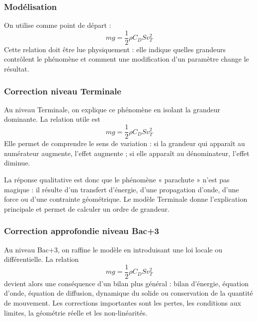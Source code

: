 \documentclass[11pt,a4paper]{article}
\begin{document}
\subsubsection*{Modélisation}

\begin{theorembox}
On utilise comme point de départ :
\[
mg=\frac12\rho C_DSv_T^2
\]
Cette relation doit être lue physiquement : elle indique quelles grandeurs contrôlent le phénomène et comment une modification d'un paramètre change le résultat.
\end{theorembox}

\subsubsection*{Correction niveau Terminale}

\begin{corrigebox}

Au niveau Terminale, on explique ce phénomène en isolant la grandeur dominante. La relation utile est
\[
mg=\frac12\rho C_DSv_T^2
\]
Elle permet de comprendre le sens de variation : si la grandeur qui apparaît au numérateur augmente, l'effet augmente ; si elle apparaît au dénominateur, l'effet diminue.

La réponse qualitative est donc que le phénomène « parachute » n'est pas magique : il résulte d'un transfert d'énergie, d'une propagation d'onde, d'une force ou d'une contrainte géométrique. Le modèle Terminale donne l'explication principale et permet de calculer un ordre de grandeur.

\end{corrigebox}

\subsubsection*{Correction approfondie niveau Bac+3}

\begin{approfondissementbox}

Au niveau Bac+3, on raffine le modèle en introduisant une loi locale ou différentielle. La relation
\[
mg=\frac12\rho C_DSv_T^2
\]
devient alors une conséquence d'un bilan plus général : bilan d'énergie, équation d'onde, équation de diffusion, dynamique du solide ou conservation de la quantité de mouvement. Les corrections importantes sont les pertes, les conditions aux limites, la géométrie réelle et les non-linéarités.

\end{approfondissementbox}
\end{document}
